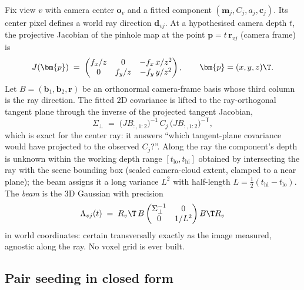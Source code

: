 Fix view $v$ with camera center $\bm{o}_v$ and a fitted component $(\bm{m}_j, C_j, a_j,
\bm{c}_j)$.  Its center pixel defines a world ray direction $\bm{d}_{vj}$.  At a hypothesised
camera depth $t$, the projective Jacobian of the pinhole map at the point
$\bm{p} = t\,\bm{r}_{vj}$ (camera frame) is
\begin{equation}
  J(\bm{p}) \;=\;
  \begin{pmatrix}
    f_x / z & 0 & -f_x\, x / z^2\\
    0 & f_y / z & -f_y\, y / z^2
  \end{pmatrix},
  \qquad \bm{p} = (x, y, z)\T .
  \label{eq:jacobian}
\end{equation}
Let $B = (\bm{b}_1, \bm{b}_2, \bm{r})$ be an orthonormal camera-frame basis whose third column
is the ray direction.  The fitted 2D covariance is lifted to the ray-orthogonal tangent plane
through the inverse of the projected tangent Jacobian,
\begin{equation}
  \Sigma_{\perp}
  \;=\;
  \big(J B_{:,1:2}\big)^{-1}\, C_j\, \big(J B_{:,1:2}\big)^{-\mathsf{T}},
  \label{eq:tangent-lift}
\end{equation}
which is exact for the center ray: it answers ``which tangent-plane covariance would have
projected to the observed $C_j$?''.  Along the ray the component's depth is unknown within
the working depth range $[t_{\mathrm{lo}}, t_{\mathrm{hi}}]$ obtained by intersecting the ray
with the scene bounding box (scaled camera-cloud extent, clamped to a near plane); the beam
assigns it a long variance $L^2$ with half-length
$L = \tfrac12 (t_{\mathrm{hi}} - t_{\mathrm{lo}})$.  The \emph{beam} is the 3D Gaussian with
precision
\begin{equation}
  \Lambda_{vj}(t)
  \;=\;
  R_v\T \, B \begin{pmatrix} \Sigma_{\perp}^{-1} & 0 \\ 0 & 1/L^2 \end{pmatrix} B\T R_v
  \label{eq:beam-precision}
\end{equation}
in world coordinates: certain transversally exactly as the image measured, agnostic along the
ray.  No voxel grid is ever built.

\subsection{Pair seeding in closed form}
\label{sec:seeding}

